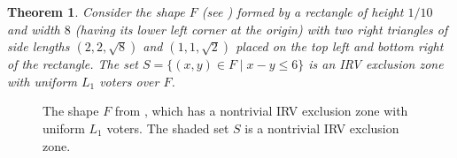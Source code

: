 \documentclass{article}
\theoremstyle{theorem}
\newtheorem{theorem}{Theorem}
\theoremstyle{definition}
\begin{document}



\begin{theorem}\label{thm:golf-flag}
  Consider the shape $F$  (see ) formed by a rectangle of height $1/10$ and width $8$ (having its lower left corner at the origin) with two right triangles of side lengths $(2, 2, \sqrt 8)$ and $(1, 1, \sqrt 2)$ placed on the top left and bottom right of the rectangle. The set $S = \{(x, y) \in F \mid x - y \le 6\}$ is an IRV exclusion zone with uniform $L_1$ voters over $F$. 
\end{theorem}

\begin{figure}[t]
\centering
    \caption{The shape $F$ from , which has a nontrivial IRV exclusion zone with uniform $L_1$ voters. The shaded set $S$ is a nontrivial IRV exclusion zone.}\label{fig:funny-shape}
\end{figure}
\end{document}
